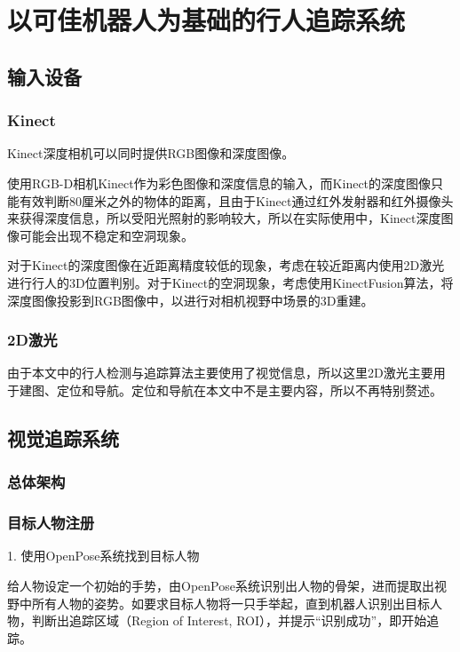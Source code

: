 
\chapter{以可佳机器人为基础的行人追踪系统}

\section{输入设备}

\subsection{Kinect}

  Kinect深度相机可以同时提供RGB图像和深度图像。

  使用RGB-D相机Kinect作为彩色图像和深度信息的输入，而Kinect的深度图像只能有效判断80厘米之外的物体的距离，且由于Kinect通过红外发射器和红外摄像头来获得深度信息，所以受阳光照射的影响较大，所以在实际使用中，Kinect深度图像可能会出现不稳定和空洞现象。

  对于Kinect的深度图像在近距离精度较低的现象，考虑在较近距离内使用2D激光进行行人的3D位置判别。对于Kinect的空洞现象，考虑使用KinectFusion算法\cite{newcombe2011kinectfusion}，将深度图像投影到RGB图像中，以进行对相机视野中场景的3D重建。

\subsection{2D激光}

  由于本文中的行人检测与追踪算法主要使用了视觉信息，所以这里2D激光主要用于建图、定位和导航。定位和导航在本文中不是主要内容，所以不再特别赘述。

\section{视觉追踪系统}

\subsection{总体架构}

\subsection{目标人物注册}
1. 使用OpenPose系统找到目标人物

给人物设定一个初始的手势，由OpenPose系统识别出人物的骨架，进而提取出视野中所有人物的姿势。如要求目标人物将一只手举起，直到机器人识别出目标人物，判断出追踪区域（Region of Interest, ROI），并提示“识别成功”，即开始追踪。

